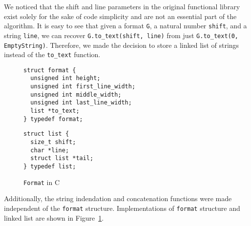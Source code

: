 \documentclass[14pt]{constructor-diploma}
\begin{document}
We noticed that the shift and line parameters in the original functional library exist solely for the sake of code simplicity and
are not an essential part of the algorithm. 
It is easy to see that given a format \texttt{G}, 
a natural number \texttt{shift}, and a string \texttt{line}, we can recover \texttt{G.to\_text(shift, line)}
from just \texttt{G.to\_text(0, EmptyString)}. Therefore, we made the decision to store a linked list of strings instead of the \texttt{to\_text} function. 
\begin{figure}[H]
\begin{minipage}{0.5\textwidth}

\begin{mdframed}[backgroundcolor=bg]
\begin{verbatim}
struct format {
  unsigned int height;
  unsigned int first_line_width;
  unsigned int middle_width;
  unsigned int last_line_width;
  list *to_text;
} typedef format;
\end{verbatim}
\end{mdframed}
\vspace*{-35pt}
\end{minipage}
\begin{minipage}{0.5\textwidth}

\begin{mdframed}[backgroundcolor=bg]
\begin{verbatim}
struct list {
  size_t shift;
  char *line;
  struct list *tail;
} typedef list;
\end{verbatim}
\end{mdframed}
\end{minipage}
\vspace*{30pt}
\caption{\texttt{Format} in C}
\label{fig:format_C}
\end{figure}
Additionally, the string indendation and concatenation functions were made independent of the \texttt{format} structure.
Implementations of \texttt{format} structure and linked list are shown in Figure~\ref{fig:format_C}.
\end{document}
